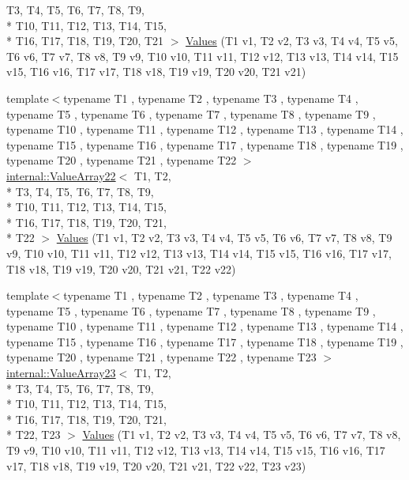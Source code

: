 \begin{DoxyCompactItemize}
T3, T4, T5, T6, T7, T8, T9, \\*
T10, T11, T12, T13, T14, T15, \\*
T16, T17, T18, T19, T20, T21 $>$ \hyperlink{namespacetesting_a6f3b9661b48f2c663dbe5fcfb0720f5f}{Values} (T1 v1, T2 v2, T3 v3, T4 v4, T5 v5, T6 v6, T7 v7, T8 v8, T9 v9, T10 v10, T11 v11, T12 v12, T13 v13, T14 v14, T15 v15, T16 v16, T17 v17, T18 v18, T19 v19, T20 v20, T21 v21)
\item 
{\footnotesize template$<$typename T1 , typename T2 , typename T3 , typename T4 , typename T5 , typename T6 , typename T7 , typename T8 , typename T9 , typename T10 , typename T11 , typename T12 , typename T13 , typename T14 , typename T15 , typename T16 , typename T17 , typename T18 , typename T19 , typename T20 , typename T21 , typename T22 $>$ }\\\hyperlink{classtesting_1_1internal_1_1_value_array22}{internal\-::\-Value\-Array22}$<$ T1, T2, \\*
T3, T4, T5, T6, T7, T8, T9, \\*
T10, T11, T12, T13, T14, T15, \\*
T16, T17, T18, T19, T20, T21, \\*
T22 $>$ \hyperlink{namespacetesting_aadfff0d803156b98ff1ffa5f1d95c350}{Values} (T1 v1, T2 v2, T3 v3, T4 v4, T5 v5, T6 v6, T7 v7, T8 v8, T9 v9, T10 v10, T11 v11, T12 v12, T13 v13, T14 v14, T15 v15, T16 v16, T17 v17, T18 v18, T19 v19, T20 v20, T21 v21, T22 v22)
\item 
{\footnotesize template$<$typename T1 , typename T2 , typename T3 , typename T4 , typename T5 , typename T6 , typename T7 , typename T8 , typename T9 , typename T10 , typename T11 , typename T12 , typename T13 , typename T14 , typename T15 , typename T16 , typename T17 , typename T18 , typename T19 , typename T20 , typename T21 , typename T22 , typename T23 $>$ }\\\hyperlink{classtesting_1_1internal_1_1_value_array23}{internal\-::\-Value\-Array23}$<$ T1, T2, \\*
T3, T4, T5, T6, T7, T8, T9, \\*
T10, T11, T12, T13, T14, T15, \\*
T16, T17, T18, T19, T20, T21, \\*
T22, T23 $>$ \hyperlink{namespacetesting_a820991f1c28518a0c218176bd7192de8}{Values} (T1 v1, T2 v2, T3 v3, T4 v4, T5 v5, T6 v6, T7 v7, T8 v8, T9 v9, T10 v10, T11 v11, T12 v12, T13 v13, T14 v14, T15 v15, T16 v16, T17 v17, T18 v18, T19 v19, T20 v20, T21 v21, T22 v22, T23 v23)
\item 

\end{DoxyCompactItemize}
